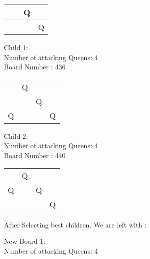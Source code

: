 \documentclass[a4paper,10pt]{article}
\begin{document}
\begin{flushleft}
\begin{flushleft}
\begin{flushleft}
\begin{flushleft}
\begin{flushleft}
\begin{flushleft}
\begin{flushleft}
\begin{flushleft}
\begin{flushleft}
\begin{tabular}{| l | l | l | l |}
     & & Q & \\ \hline
     & & & Q \\ \hline
    \end{tabular}
\begin{flushleft}
Child 1: \\
Number of attacking Queens: 4 \\
Board Number : 436\\
\vspace{5mm}
    \begin{tabular}{| l | l | l | l |}
    \hline
     & & & \\ \hline
     & Q & & \\ \hline
     & & Q & \\ \hline
     Q & & & Q \\ \hline
    \end{tabular}
\begin{flushleft}
Child 2: \\
Number of attacking Queens: 4\\
Board Number : 440\\
\vspace{5mm}
    \begin{tabular}{| l | l | l | l |}
    \hline
     & & & \\ \hline
     & Q & & \\ \hline
     Q & & Q & \\ \hline
     & & & Q \\ \hline
    \end{tabular}
\break
\break
After Selecting best children. We are left with :
\break
\begin{flushleft}
New Board 1: \\
Number of attacking Queens: 4\\
\vspace{5mm}


\end{flushleft}
\end{flushleft}
\end{flushleft}
\end{flushleft}
\end{flushleft}
\end{flushleft}
\end{flushleft}
\end{flushleft}
\end{flushleft}
\end{flushleft}
\end{flushleft}
\end{flushleft}
\end{document}
